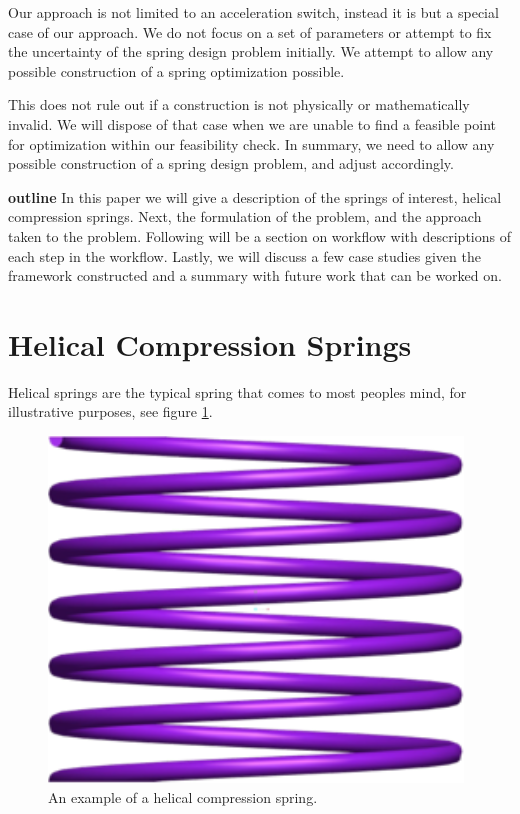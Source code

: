 \documentclass[10pt]{article}
\begin{document}
Our approach is not limited to an acceleration switch, instead it is but a special case of our approach. We do not focus on a set of parameters or attempt to fix the uncertainty of the spring design problem initially. We attempt to allow any possible construction of a spring optimization possible. 

This does not rule out if a construction is not physically or mathematically invalid. We will dispose of that case when we are unable to find a feasible point for optimization within our feasibility check. In summary, we need to allow any possible construction of a spring design problem, and adjust accordingly. 


\textbf{outline}
In this paper we will give a description of the springs of interest, helical compression springs. Next, the formulation of the problem, and the approach taken to the problem. Following will be a section on workflow with descriptions of each step in the workflow. Lastly, we will discuss a few case studies given the framework constructed and a summary with future work that can be worked on.





\section{Helical Compression Springs}
\label{sec:Springs}

Helical springs are the typical spring that comes to most peoples mind, for illustrative purposes, see figure \ref{Spring}. 

		\begin{figure}[h]
		 \begin{center}\includegraphics[scale=.2]{Spring.png}\end{center}
		 \caption{An example of a helical compression spring.}
		 \label{Spring}
		 
		 \end{figure}
\end{document}
